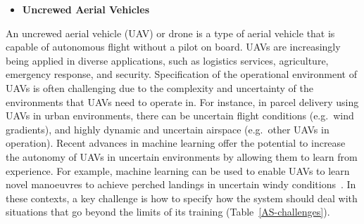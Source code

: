 \documentclass[sigconf,nonacm]{acmart}%
\begin{document}
\begin{itemize}[leftmargin=0.5cm]
	\item \textbf{Uncrewed Aerial Vehicles}
\end{itemize}
An uncrewed aerial vehicle (UAV) or drone is a type of aerial vehicle that is capable of autonomous flight without a pilot on board. UAVs are increasingly being applied in diverse applications, such as logistics services, agriculture, emergency response, and security. Specification of the operational environment of UAVs is often challenging due to the complexity and uncertainty of the environments that UAVs need to operate in. 
For instance, in parcel delivery using UAVs in urban environments, there can be uncertain flight conditions (e.g.\ wind gradients), and highly dynamic and uncertain airspace (e.g.\ other UAVs in operation). 
Recent advances in machine learning offer the potential to increase the autonomy of UAVs in uncertain environments by allowing them to learn from experience. 
For example, machine learning can be used to enable UAVs to learn novel manoeuvres to achieve perched landings in uncertain windy conditions~\cite{Fletcher2021}. 
In these contexts, a key challenge is how to specify how the system should deal with situations that go beyond the limits of its training (Table~\ref{AS-challenges}).
\end{document}
